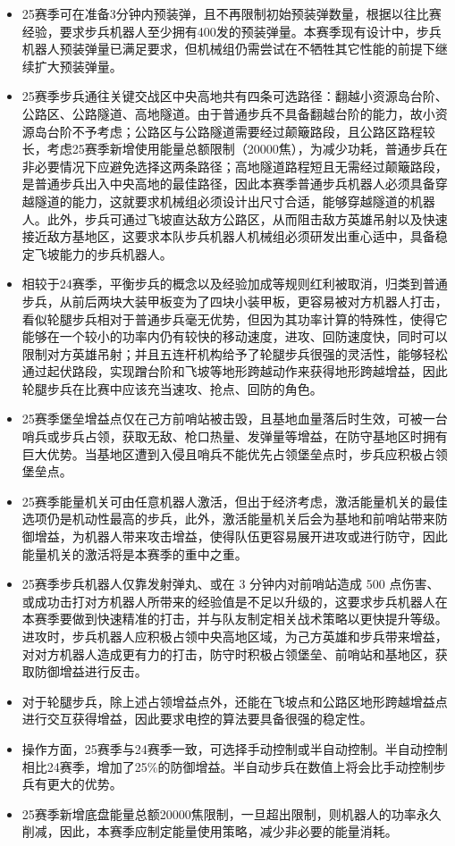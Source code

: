             \begin{itemize}
                \item 25赛季可在准备3分钟内预装弹，且不再限制初始预装弹数量，根据以往比赛经验，要求步兵机器人至少拥有400发的预装弹量。本赛季现有设计中，步兵机器人预装弹量已满足要求，但机械组仍需尝试在不牺牲其它性能的前提下继续扩大预装弹量。
                \item 25赛季步兵通往关键交战区中央高地共有四条可选路径：翻越小资源岛台阶、公路区、公路隧道、高地隧道。由于普通步兵不具备翻越台阶的能力，故小资源岛台阶不予考虑；公路区与公路隧道需要经过颠簸路段，且公路区路程较长，考虑25赛季新增使用能量总额限制（20000焦），为减少功耗，普通步兵在非必要情况下应避免选择这两条路径；高地隧道路程短且无需经过颠簸路段，是普通步兵出入中央高地的最佳路径，因此本赛季普通步兵机器人必须具备穿越隧道的能力，这就要求机械组必须设计出尺寸合适，能够穿越隧道的机器人。此外，步兵可通过飞坡直达敌方公路区，从而阻击敌方英雄吊射以及快速接近敌方基地区，这要求本队步兵机器人机械组必须研发出重心适中，具备稳定飞坡能力的步兵机器人。
                \item 相较于24赛季，平衡步兵的概念以及经验加成等规则红利被取消，归类到普通步兵，从前后两块大装甲板变为了四块小装甲板，更容易被对方机器人打击，看似轮腿步兵相对于普通步兵毫无优势，但因为其功率计算的特殊性，使得它能够在一个较小的功率内仍有较快的移动速度，进攻、回防速度快，同时可以限制对方英雄吊射；并且五连杆机构给予了轮腿步兵很强的灵活性，能够轻松通过起伏路段，实现蹭台阶和飞坡等地形跨越动作来获得地形跨越增益，因此轮腿步兵在比赛中应该充当速攻、抢点、回防的角色。
                \item 25赛季堡垒增益点仅在己方前哨站被击毁，且基地血量落后时生效，可被一台哨兵或步兵占领，获取无敌、枪口热量、发弹量等增益，在防守基地区时拥有巨大优势。当基地区遭到入侵且哨兵不能优先占领堡垒点时，步兵应积极占领堡垒点。
                \item 25赛季能量机关可由任意机器人激活，但出于经济考虑，激活能量机关的最佳选项仍是机动性最高的步兵，此外，激活能量机关后会为基地和前哨站带来防御增益，为机器人带来攻击增益，使得队伍更容易展开进攻或进行防守，因此能量机关的激活将是本赛季的重中之重。
                \item 25赛季步兵机器人仅靠发射弹丸、或在 3 分钟内对前哨站造成 500 点伤害、或成功击打对方机器人所带来的经验值是不足以升级的，这要求步兵机器人在本赛季要做到快速精准的打击，并与队友制定相关战术策略以更快提升等级。进攻时，步兵机器人应积极占领中央高地区域，为己方英雄和步兵带来增益，对对方机器人造成更有力的打击，防守时积极占领堡垒、前哨站和基地区，获取防御增益进行反击。
                \item 对于轮腿步兵，除上述占领增益点外，还能在飞坡点和公路区地形跨越增益点进行交互获得增益，因此要求电控的算法要具备很强的稳定性。
                \item 操作方面，25赛季与24赛季一致，可选择手动控制或半自动控制。半自动控制相比24赛季，增加了25\%的防御增益。半自动步兵在数值上将会比手动控制步兵有更大的优势。	
                \item 25赛季新增底盘能量总额20000焦限制，一旦超出限制，则机器人的功率永久削减，因此，本赛季应制定能量使用策略，减少非必要的能量消耗。
            \end{itemize}
        
